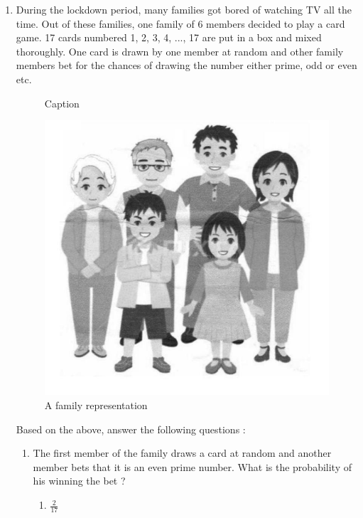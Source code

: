 \begin{enumerate}

\item During the lockdown period, many families got bored of watching TV all the time. Out of these families, one family of 6 members decided to play a card game. 17 cards numbered 1, 2, 3, 4, ..., 17 are put in a box and mixed thoroughly. One card is drawn by one member at random and other family members bet for the chances of drawing the number either prime, odd or even etc.     
	
	\begin{figure}[!h]
	\centering
	
	\caption{Caption}
	\label{fig:0}
        \end{figure}
	
	\begin{figure}[h!]
	\centering
	\includegraphics[width=\columnwidth]{figs/1.jpg}
	\caption{A family representation}
	\label{fig:1}
	\end{figure} 
Based on the above, answer the following questions : 		
\begin{enumerate}
\item The first member of the family draws a card at random and another member bets that it is an even prime number. What is the probability of his winning the bet ? 
	\begin{enumerate}
	\item $\frac{2}{17}$

\end{enumerate}
\end{enumerate}
\end{enumerate}
